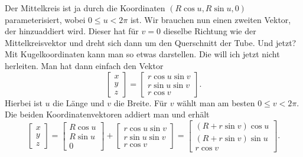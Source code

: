 \documentclass[a4paper,12pt,fleqn]{article}
\begin{document}
Der Mittelkreis ist ja durch die Koordinaten $(R\cos u,R\sin u,0)$
parameterisiert, wobei $0\le u<2\pi$ ist. Wir brauchen nun
einen zweiten Vektor, der hinzuaddiert wird. Dieser hat für $v=0$
dieselbe Richtung wie der Mittelkreisvektor und dreht sich dann um
den Querschnitt der Tube. Und jetzt? Mit Kugelkoordinaten kann man
so etwas darstellen. Die will ich jetzt nicht herleiten. Man hat
dann einfach den Vektor
\begin{equation}
\begin{bmatrix}
x\\ y\\ z
\end{bmatrix}
= \begin{bmatrix}
r\cos u\sin v\\
r\sin u\sin v\\
r\cos v
\end{bmatrix}.
\end{equation}
Hierbei ist $u$ die Länge und $v$ die Breite. Für $v$ wählt man
am besten $0\le v<2\pi$. Die beiden Koordinatenvektoren addiert man
und erhält
\begin{equation}\label{Torus}
\begin{bmatrix}
x\\ y\\ z
\end{bmatrix}
= \begin{bmatrix}
R\cos u\\
R\sin u\\
0
\end{bmatrix}+\begin{bmatrix}
r\cos u\sin v\\
r\sin u\sin v\\
r\cos v
\end{bmatrix}
= \begin{bmatrix}
(R+r\sin v)\cos u\\
(R+r\sin v)\sin u\\
r\cos v
\end{bmatrix}.
\end{equation}
\end{document}
